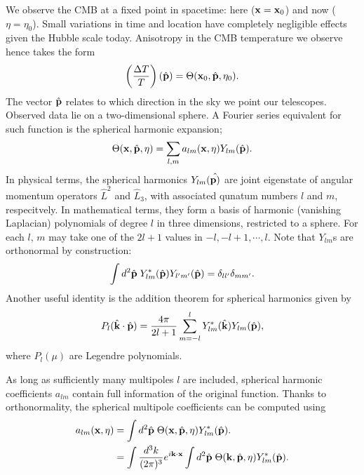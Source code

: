 We observe the CMB at a fixed point in spacetime: here ($\mathbf{x}=\mathbf{x}_0$) and now ($\eta=\eta_0$). Small variations in time and location have completely negligible effects given the Hubble scale today. Anisotropy in the CMB temperature we observe hence takes the form
\begin{align}
	\left( \frac{\Delta T}{T} \right) (\hat{\mathbf{p}}) = \Theta(\mathbf{x}_0, \hat{\mathbf{p}}, \eta_0).
\end{align}
The vector $\hat{\mathbf{p}}$ relates to which direction in the sky we point our telescopes. Observed data lie on a two-dimensional sphere. A Fourier series equivalent for such function is the spherical harmonic expansion;
\begin{align}
	\Theta(\mathbf{x}, \hat{\mathbf{p}}, \eta) = \sum_{l,m} a_{lm}(\mathbf{x},\eta) Y_{lm}(\hat{\mathbf{p}}). 
\end{align} 
In physical terms, the spherical harmonics $Y_{lm}(\hat{\mathbf{p})}$ are joint eigenstate of angular momentum operators $\hat{L}^2$ and $\hat{L}_3$, with associated qunatum numbers $l$ and $m$, respecitvely. In mathematical terms, they form a basis of harmonic (vanishing Laplacian) polynomials of degree $l$ in three dimensions, restricted to a sphere. For each $l$, $m$ may take one of the $2l+1$ values in ${-l,-l+1,\cdots,l}$. Note that $Y_{lm}$s are orthonormal by construction:
\begin{align}
	\int d^2\hat{\mathbf{p}} \; Y^*_{lm} (\hat{\mathbf{p}}) Y_{l'm'} (\hat{\mathbf{p}}) = \delta_{ll'} \delta_{mm'}. \label{eqn:spherical_harmonic_orthonormality}
\end{align}
Another useful identity is the addition theorem for spherical harmonics given by
\begin{align}
	P_l (\hat{\mathbf{k}} \cdot \hat{\mathbf{p}}) = \frac{4\pi}{2l+1} \sum_{m=-l}^{l} Y^*_{lm} (\hat{\mathbf{k}}) Y_{lm} (\hat{\mathbf{p}}), \label{eqn:harmonic_addition_theorem}
\end{align}
where $P_l(\mu)$ are Legendre polynomials.
	
As long as sufficiently many multipoles $l$ are included, spherical harmonic coefficients $a_{lm}$ contain full information of the original function. Thanks to orthonormality, the spherical multipole coefficients can be computed using
\begin{align}
	a_{lm} (\mathbf{x},\eta) &= \int d^2\hat{\mathbf{p}} \; \Theta(\mathbf{x}, \hat{\mathbf{p}},\eta) Y^*_{lm} (\hat{\mathbf{p}}). \\
	&= \int \frac{d^3 k}{(2\pi)^3} e^{i\mathbf{k}\cdot\mathbf{x}} \int d^2\hat{\mathbf{p}} \; \Theta(\mathbf{k},\hat{\mathbf{p}},\eta) Y^*_{lm}(\hat{\mathbf{p}}). \label{eqn:alm_derivation_alm_using_theta}
\end{align}

